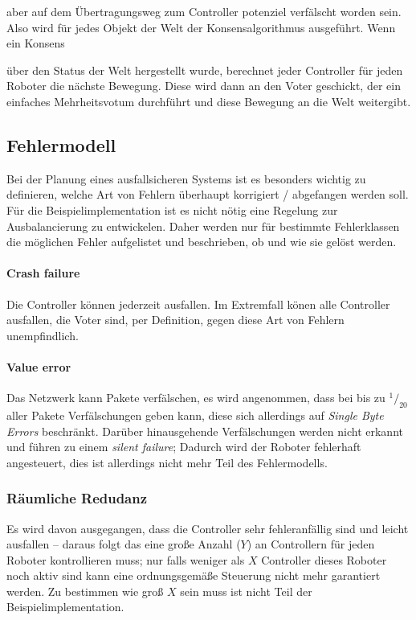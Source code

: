 aber auf dem {\"{U}}bertragungsweg zum Controller potenziel verf{\"{a}}lscht worden sein. Also wird f{\"{u}}r jedes Objekt der Welt der Konsensalgorithmus ausgef{\"{u}}hrt. Wenn ein Konsens {\"{u}ber den Status der Welt hergestellt wurde, berechnet 
jeder Controller f{\"{u}}r jeden Roboter die n{\"{a}}chste Bewegung. Diese wird dann an den Voter geschickt, der ein einfaches Mehrheitsvotum durchf{\"{u}}hrt und diese Bewegung an die Welt weitergibt.

\subsection{Fehlermodell} \label{error-model}
Bei der Planung eines ausfallsicheren Systems ist es besonders wichtig zu definieren, welche Art von Fehlern
{\"{u}}berhaupt korrigiert / abgefangen werden soll. F{\"{u}}r die Beispielimplementation ist es nicht
n{\"{o}}tig eine Regelung zur Ausbalancierung zu entwickelen. Daher werden nur f{\"{u}}r bestimmte Fehlerklassen
die m{\"{o}}glichen Fehler aufgelistet und beschrieben, ob und wie sie gel{\"{o}}st werden.

\paragraph{Crash failure} Die Controller k{\"{o}}nnen jederzeit ausfallen. Im Extremfall k{\"{o}}nen alle Controller ausfallen, die Voter sind, per Definition, gegen diese Art von Fehlern unempfindlich.

\paragraph{Value error} Das Netzwerk kann Pakete verf{\"{a}}lschen, es wird angenommen, dass bei bis zu
$^1/_{20}$ aller Pakete Verf{\"{a}}lschungen geben kann, diese sich allerdings auf
\textit{Single Byte Errors} beschr{\"{a}}nkt. Dar{\"{u}}ber hinausgehende Verf{\"{a}}lschungen werden nicht
erkannt und f{\"{u}}hren zu einem \textit{silent failure}; Dadurch wird der Roboter fehlerhaft angesteuert,
dies ist allerdings nicht mehr Teil des Fehlermodells.

\subsubsection{R{\"{a}}umliche Redudanz}
Es wird davon ausgegangen, dass die Controller sehr fehleranf{\"{a}}llig sind und leicht ausfallen --
daraus folgt das eine gro{\ss}e Anzahl ($Y$) an Controllern f{\"{u}}r jeden Roboter kontrollieren muss;
nur falls weniger als $X$ Controller dieses Roboter noch aktiv sind kann eine ordnungsgem{\"{a}}{\ss}e
Steuerung nicht mehr garantiert werden. Zu bestimmen wie gro{\ss} $X$ sein muss ist nicht Teil der
Beispielimplementation.

}

